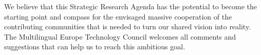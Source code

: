 \documentclass[10pt, plain]{../../metanetpaper}
\begin{document}
\begin{multicols}{2}
We believe that this Strategic Research Agenda has the potential to become the starting point and compass for the envisaged massive cooperation of the contributing communities that is needed to turn our shared vision into reality. The Multilingual Europe Technology Council welcomes all comments and suggestions that can help us to reach this ambitious goal.
\end{multicols}







\clearpage


\end{document}
